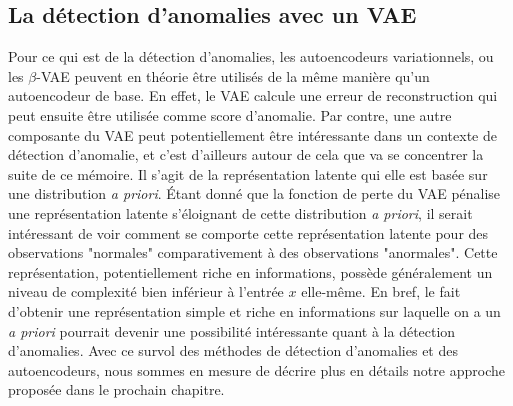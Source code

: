 \subsection{La détection d'anomalies avec un VAE}

Pour ce qui est de la détection d'anomalies, les autoencodeurs variationnels, ou les $\beta$-VAE peuvent en théorie être utilisés de la même manière qu'un autoencodeur de base. En effet, le VAE calcule une erreur de reconstruction qui peut ensuite être utilisée comme score d'anomalie. Par contre, une autre composante du VAE peut potentiellement être intéressante dans un contexte de détection d'anomalie, et c'est d'ailleurs autour de cela que va se concentrer la suite de ce mémoire. Il s'agit de la représentation latente qui elle est basée sur une distribution \textit{a priori}. Étant donné que la fonction de perte du VAE pénalise une représentation latente s'éloignant de cette distribution \textit{a priori}, il serait intéressant de voir comment se comporte cette représentation latente pour des observations "normales" comparativement à des observations "anormales". Cette représentation, potentiellement riche en informations, possède généralement un niveau de complexité bien inférieur à l'entrée $x$ elle-même. En bref, le fait d'obtenir une représentation simple et riche en informations sur laquelle on a un \textit{a priori} pourrait devenir une possibilité intéressante quant à la détection d'anomalies. Avec ce survol des méthodes de détection d'anomalies et des autoencodeurs, nous sommes en mesure de décrire plus en détails notre approche proposée dans le prochain chapitre.
